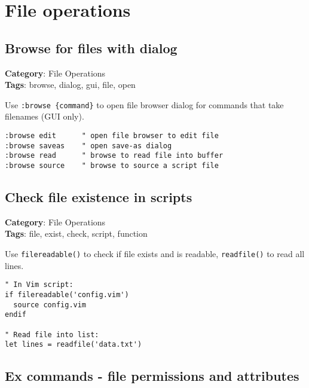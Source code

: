 {{{{{{\chapter{File operations}
\section{Browse for files with dialog}

\textbf{Category}: File Operations\\ \textbf{Tags}: browse, dialog, gui, file, open
\vspace{0.5cm}

Use {\footnotesize \Verb§:browse {command}§} to open file browser dialog for commands that take filenames (GUI only).

\begin{Exa*}{}
\begin{Verbatim}[fontsize=\footnotesize, breaklines, breakanywhere]
:browse edit      " open file browser to edit file
:browse saveas    " open save-as dialog
:browse read      " browse to read file into buffer
:browse source    " browse to source a script file
\end{Verbatim}
\end{Exa*}

\section{Check file existence in scripts}

\textbf{Category}: File Operations\\ \textbf{Tags}: file, exist, check, script, function
\vspace{0.5cm}

Use {\footnotesize \Verb§filereadable()§} to check if file exists and is readable, {\footnotesize \Verb§readfile()§} to read all lines.

\begin{Exa*}{}
\begin{Verbatim}[fontsize=\footnotesize, breaklines, breakanywhere]
" In Vim script:
if filereadable('config.vim')
  source config.vim
endif

" Read file into list:
let lines = readfile('data.txt')
\end{Verbatim}
\end{Exa*}

\section{Ex commands - file permissions and attributes}

}}}}}}
